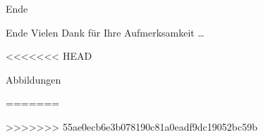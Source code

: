 \documentclass[mathserif,9pt]{article}
\begin{document}
    \begin{frame}{Ende}
        \begin{block}{Ende}
            Vielen Dank für Ihre Aufmerksamkeit \ldots
        \end{block}
    \end{frame}

<<<<<<< HEAD
    \begin{frame}{Abbildungen}
    \end{frame}


=======

>>>>>>> 55ae0ecb6e3b078190c81a0eadf9dc19052bc59b
\end{document}
